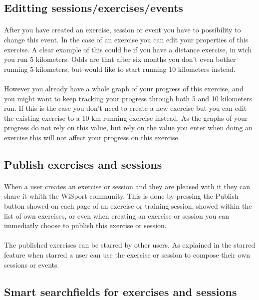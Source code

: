 \documentclass[11pt,a4paper]{scrartcl}
\begin{document}
\subsection{Editting sessions/exercises/events}
\paragraph{}After you have created an exercise, session or event you have to possibility to change this event. In the case of an exercise you can edit your properties of this exercise. A clear example of this could be if you have a distance exercise, in wich you run 5 kilometers. Odds are that after six months you don't even bother running 5 kilometers, but would like to start running 10 kilometers instead.
\paragraph{}However you already have a whole graph of your progress of this exercise, and you might want to keep tracking your progress through both 5 and 10 kilometers run. If this is the case you don't need to create a new exercise but you can edit the existing exercise to a 10 km running exercise instead. As the graphs of your progress do not rely on this value, but rely on the value you enter when doing an exercise this will not affect your progress on this exercise.
\subsection{Publish exercises and sessions}
\paragraph{}When a user creates an exercise or session and they are pleased with it they can share it whith the WiSport community. This is done by pressing the Publish button showed on each page of an exercise or training session, showed within the list of own exercises, or even when creating an exercise or session you can immediatly choose to publish this exercise or session.
\paragraph{}The published exercises can be starred by other users. As explained in the starred feature when starred a user can use the exercise or session to compose their  own sessions or events.
\subsection{Smart searchfields for exercises and sessions}
\end{document}

